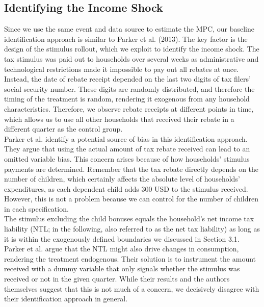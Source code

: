 \subsection{Identifying the Income Shock} \label{subsec:identification}
Since we use the same event and data source to estimate the MPC, our baseline identification approach is similar to Parker et al. (2013). The key factor is the design of the stimulus rollout, which we exploit to identify the income shock. The tax stimulus was paid out to households over several weeks as administrative and technological restrictions made it impossible to pay out all rebates at once. Instead, the date of rebate receipt depended on the last two digits of tax filers' social security number. These digits are randomly distributed, and therefore the timing of the treatment is random, rendering it exogenous from any household characteristics. Therefore, we observe rebate receipts at different points in time, which allows us to use all other households that received their rebate in a different quarter as the control group. \\
Parker et al. identify a potential source of bias in this identification approach. They argue that using the actual amount of tax rebate received can lead to an omitted variable bias. This concern arises because of how households' stimulus payments are determined. Remember that the tax rebate directly depends on the number of children, which certainly affects the absolute level of households' expenditures, as each dependent child adds 300 USD to the stimulus received. However, this is not a problem because we can control for the number of children in each specification. \\
The stimulus excluding the child bonuses equals the household's net income tax liability (NTL; in the following, also referred to as the net tax liability) as long as it is within the exogenously defined boundaries we discussed in Section 3.1. Parker et al. argue that the NTL might also drive changes in consumption, rendering the treatment endogenous. Their solution is to instrument the amount received with a dummy variable that only signals whether the stimulus was received or not in the given quarter. While their results and the authors themselves suggest that this is not much of a concern, we decisively disagree with their identification approach in general. \\
